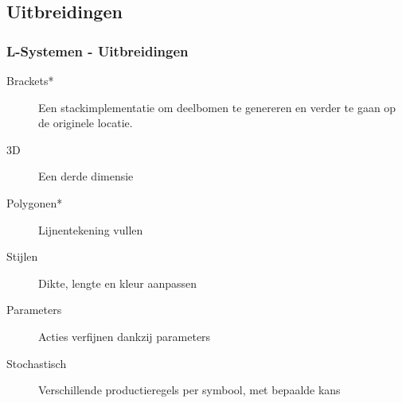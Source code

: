 \documentclass[ignorenonframetext,compress]{beamer}
\begin{document}
\subsection{Uitbreidingen}
\begin{frame}[fragile]
	\frametitle{L-Systemen - Uitbreidingen}
\begin{description}
\item[Brackets*] Een stackimplementatie om deelbomen te genereren en verder te gaan op de originele locatie.
\item[3D] Een derde dimensie
\item[Polygonen*] Lijnentekening vullen
\item[Stijlen] Dikte, lengte en kleur aanpassen
\item[Parameters] Acties verfijnen dankzij parameters 
\item[Stochastisch] Verschillende productieregels per symbool, met bepaalde kans 
\end{description}
\end{frame}
\end{document}
